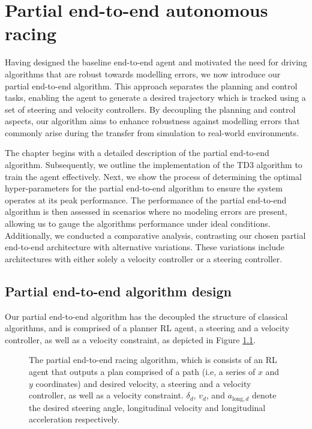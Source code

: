 \chapter{Partial end-to-end autonomous racing}
\label{chp:partial_end_to_end_autonomous_racing}

Having designed the baseline end-to-end agent and motivated the need for driving algorithms that are robust towards modelling errors, we now introduce our partial end-to-end algorithm.
This approach separates the planning and control tasks, enabling the agent to generate a desired trajectory which is tracked using a set of steering and velocity controllers.
By decoupling the planning and control aspects, our algorithm aims to enhance robustness against modelling errors that commonly arise during the transfer from simulation to real-world environments.

The chapter begins with a detailed description of the partial end-to-end algorithm.
Subsequently, we outline the implementation of the TD3 algorithm to train the agent effectively.
Next, we show the process of determining the optimal hyper-parameters for the partial end-to-end algorithm to ensure the system operates at its peak performance. 
The performance of the partial end-to-end algorithm is then assessed in scenarios where no modeling errors are present, allowing us to gauge the algorithms performance under ideal conditions. 
Additionally, we conducted a comparative analysis, contrasting our chosen partial end-to-end architecture with alternative variations. 
These variations include architectures with either solely a velocity controller or a steering controller. 



\section{Partial end-to-end algorithm design}

Our partial end-to-end algorithm has the decoupled the structure of classical algorithms, and is comprised of a planner RL agent, a steering and a velocity controller, as well as a velocity constraint, as depicted in Figure \ref{fig:steer_vel_architecture}.

\begin{figure}[htb!]
    \centering
    
    \caption[The partial end-to-end racing algorithm]{The partial end-to-end racing algorithm, which is consists of an RL agent that    outputs a plan comprised of a path (i.e, a series of $x$ and $y$ coordinates) and desired velocity, a steering and a velocity controller, as well as a velocity constraint. $\delta_{d}$, $v_{d}$, and $a_{\text{long},d}$ denote the desired steering angle, longitudinal velocity and longitudinal acceleration respectively.}
    \label{fig:steer_vel_architecture}
\end{figure}


